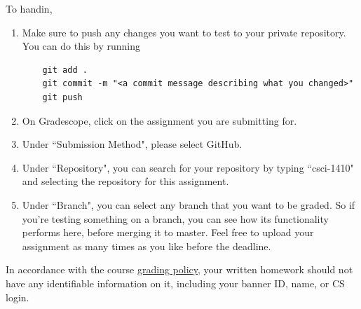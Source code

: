 \documentclass{article}
\begin{document}
To handin,
\begin{enumerate}
  \item Make sure to push any changes you want to test to your private
    repository. You can do this by running
    \begin{verbatim}
    git add .
    git commit -m "<a commit message describing what you changed>"
    git push
    \end{verbatim}

  \item On Gradescope, click on the assignment you are submitting for.

  \item Under ``Submission Method", please select GitHub.

  \item Under ``Repository", you can search for your repository by typing ``csci-1410"
    and selecting the repository for this assignment.

  \item Under ``Branch", you can select any branch that you want to be graded. So if
    you're testing something on a branch, you can see how its functionality
    performs here, before merging it to master. Feel free to upload your assignment
    as many times as you like before the deadline.
\end{enumerate}

In accordance with the course \href {https://cs1410-website.vercel.app/files/Collaboration_Policy.pdf}{grading policy},
your written homework should not have any identifiable information on it,
including your banner ID, name, or CS login.
\end{document}
